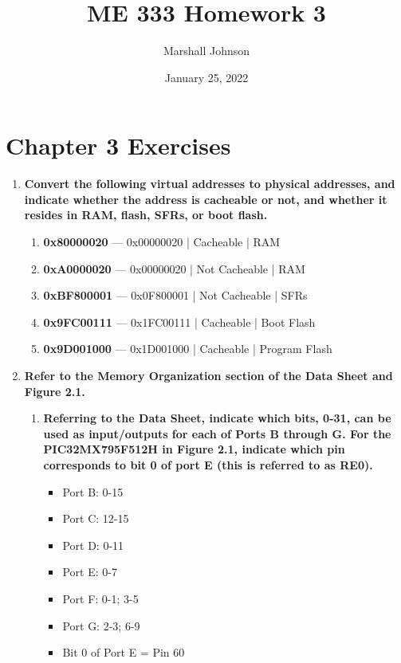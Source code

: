 \documentclass{article}
\title{ME 333 Homework 3}
\author{Marshall Johnson}
\date{January 25, 2022}
\begin{document}
\maketitle

\section*{Chapter 3 Exercises}

\begin{enumerate}[label=\textbf{\arabic*})]
    \item \textbf{Convert the following virtual addresses to physical addresses, and indicate whether the
    address is cacheable or not, and whether it resides in RAM, flash, SFRs, or boot flash.} \\

    \begin{enumerate}[label=\textbf{\alph*}.]
        \item \textbf{0x80000020} --- 0x00000020 | Cacheable | RAM
        \item \textbf{0xA0000020} --- 0x00000020 | Not Cacheable | RAM
        \item \textbf{0xBF800001} --- 0x0F800001 | Not Cacheable | SFRs
        \item \textbf{0x9FC00111} --- 0x1FC00111 | Cacheable | Boot Flash
        \item \textbf{0x9D001000} --- 0x1D001000 | Cacheable | Program Flash
    \end{enumerate}

    \setcounter{enumi}{2}
    \item \textbf{Refer to the Memory Organization section of the Data Sheet and Figure 2.1.} \\
    
    \begin{enumerate}[label=\textbf{\alph*}.]
        \item \textbf{Referring to the Data Sheet, indicate which bits, 0-31, can be used as input/outputs for
        each of Ports B through G. For the PIC32MX795F512H in Figure 2.1, indicate which
        pin corresponds to bit 0 of port E (this is referred to as RE0).} 

        \begin{itemize}
            \item Port B: 0-15
            \item Port C: 12-15
            \item Port D: 0-11
            \item Port E: 0-7
            \item Port F: 0-1; 3-5
            \item Port G: 2-3; 6-9
            \item Bit 0 of Port E = Pin 60
        \end{itemize}


\end{enumerate}
\end{enumerate}
\end{document}
